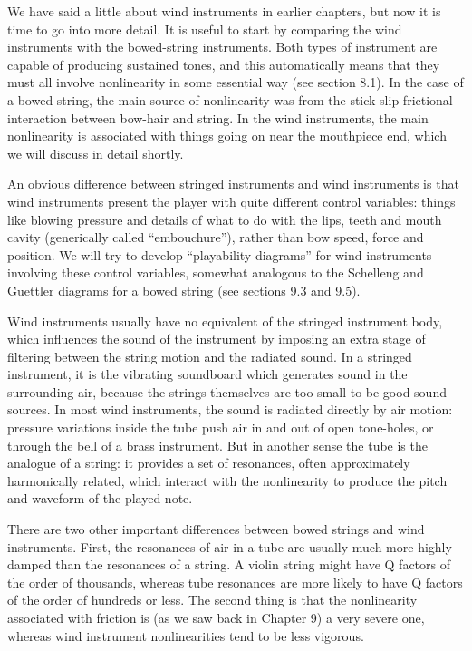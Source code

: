   We have said a little about wind instruments in earlier chapters, but now it 
  is time to go into more detail. It is useful to start by comparing the wind 
  instruments with the bowed-string instruments. Both types of instrument are 
  capable of producing sustained tones, and this automatically means that they 
  must all involve nonlinearity in some essential way (see section 8.1). In the 
  case of a bowed string, the main source of nonlinearity was from the 
  stick-slip frictional interaction between bow-hair and string. In the wind 
  instruments, the main nonlinearity is associated with things going on near 
  the mouthpiece end, which we will discuss in detail shortly. 

  An obvious difference between stringed instruments and wind instruments is 
  that wind instruments present the player with quite different control 
  variables: things like blowing pressure and details of what to do with the 
  lips, teeth and mouth cavity (generically called ``embouchure''), rather than 
  bow speed, force and position. We will try to develop ``playability 
  diagrams'' for wind instruments involving these control variables, somewhat 
  analogous to the Schelleng and Guettler diagrams for a bowed string (see 
  sections 9.3 and 9.5). 

  Wind instruments usually have no equivalent of the stringed instrument body, 
  which influences the sound of the instrument by imposing an extra stage of 
  filtering between the string motion and the radiated sound. In a stringed 
  instrument, it is the vibrating soundboard which generates sound in the 
  surrounding air, because the strings themselves are too small to be good 
  sound sources. In most wind instruments, the sound is radiated directly by 
  air motion: pressure variations inside the tube push air in and out of open 
  tone-holes, or through the bell of a brass instrument. But in another sense 
  the tube is the analogue of a string: it provides a set of resonances, often 
  approximately harmonically related, which interact with the nonlinearity to 
  produce the pitch and waveform of the played note. 

  There are two other important differences between bowed strings and wind 
  instruments. First, the resonances of air in a tube are usually much more 
  highly damped than the resonances of a string. A violin string might have Q 
  factors of the order of thousands, whereas tube resonances are more likely to 
  have Q factors of the order of hundreds or less. The second thing is that the 
  nonlinearity associated with friction is (as we saw back in Chapter 9) a very 
  severe one, whereas wind instrument nonlinearities tend to be less vigorous. 

